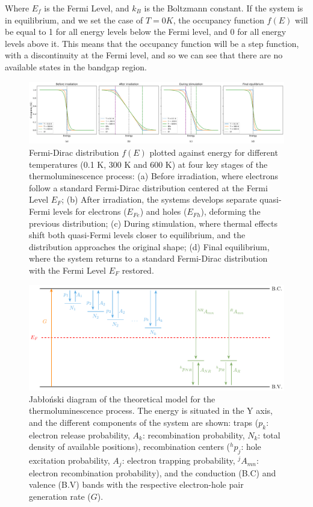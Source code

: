 \vspace{10pt}
Where $E_f$ is the Fermi Level, and $k_B$ is the Boltzmann constant. If the system is in equilibrium, and we set the case of $T=0K$, the occupancy function $f(E)$ will be equal to 1 for all energy levels below the Fermi level, and 0 for all energy levels above it. This means that the occupancy function will be a step function, with a discontinuity at the Fermi level, and so we can see that there are no available states in the bandgap region.

\begin{figure}
  \centering
  \includegraphics[width=\textwidth]{Images/FD_irradiation.png}
  \caption{Fermi-Dirac distribution $f(E)$ plotted against energy for different temperatures (0.1 K, 300 K and 600 K) at four key stages of the thermoluminescence process: (a) Before irradiation, where electrons follow a standard Fermi-Dirac distribution centered at the Fermi Level $E_F$; (b) After irradiation, the systems develops separate quasi-Fermi levels for electrons ($E_{Fe}$) and holes ($E_{Fh}$), deforming the previous distribution; (c) During stimulation, where thermal effects shift both quasi-Fermi levels closer to equilibrium, and the distribution approaches the original shape; (d) Final equilibrium, where the system returns to a standard Fermi-Dirac distribution with the Fermi Level $E_F$ restored. }
  \label{fig:FD_irradiation}
\end{figure}

\begin{figure}[H]
  \centering
  \includegraphics[width=\textwidth]{Images/modeldiagram.pdf}
  \caption{Jab\l oński diagram of the theoretical model for the thermoluminescence process. The energy is situated in the Y axis, and the different components of the system are shown: traps ($p_k$: electron release probability, $A_k$: recombination probability, $N_k$: total density of available positions), recombination centers ($^hp_j$: hole excitation probability, $A_j$: electron trapping probability, $^jA_{mn}$: electron recombination probability), and the conduction (B.C) and valence (B.V) bands with the respective electron-hole pair generation rate ($G$).}
  \label{fig:TheoreticalModel}
\end{figure}

